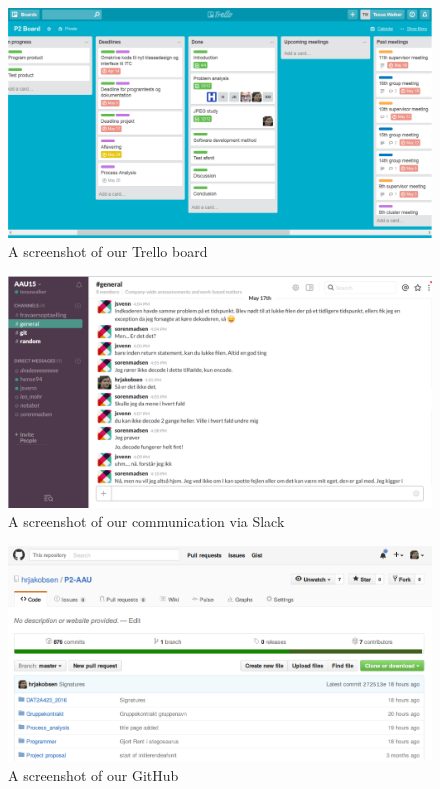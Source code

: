 \begin{figure}
	\centering
	\includegraphics[width=1 \textwidth]{figures/trello.png}
	\caption{A screenshot of our Trello board}
	\label{fig:trello}
\end{figure}

\begin{figure}
	\centering
	\includegraphics[width=1 \textwidth]{figures/slack.png}
	\caption{A screenshot of our communication via Slack}
	\label{fig:slack}
\end{figure}

\begin{figure}
	\centering
	\includegraphics[width=1 \textwidth]{figures/git.png}
	\caption{A screenshot of our GitHub}
	\label{fig:git}
\end{figure}

